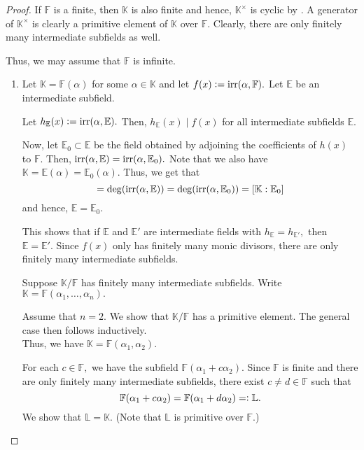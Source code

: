 \pet*\label{thm:pet2}
\begin{flushright}\hyperref[thm:pet]{\upsym}\end{flushright}
\begin{proof}
    If $\mathbb{F}$ is a finite, then $\mathbb{K}$ is also finite and hence, $\mathbb{K}^\times$ is cyclic by . A generator of $\mathbb{K}^\times$ is clearly a primitive element of $\mathbb{K}$ over $\mathbb{F}.$ Clearly, there are only finitely many intermediate subfields as well. 

    Thus, we may assume that $\mathbb{F}$ is infinite.
    \begin{enumerate}
        \item \forward Let $\mathbb{K} = \mathbb{F}(\alpha)$ for some $\alpha \in \mathbb{K}$ and let $f(x) \vcentcolon= \operatorname{irr}(\alpha, \mathbb{F}).$ Let $\mathbb{E}$ be an intermediate subfield. 

        Let $h_{\mathbb{E}}(x) \vcentcolon= \operatorname{irr}(\alpha, \mathbb{E}).$ Then, $h_{\mathbb{E}}(x) \mid f(x)$ for all intermediate subfields $\mathbb{E}.$

        Now, let $\mathbb{E}_0 \subset \mathbb{E}$ be the field obtained by adjoining the coefficients of $h(x)$ to $\mathbb{F}.$ Then, $\operatorname{irr}(\alpha, \mathbb{E}) = \operatorname{irr}(\alpha, \mathbb{E}_{0}).$ Note that we also have $\mathbb{K} = \mathbb{E}(\alpha) = \mathbb{E}_0(\alpha).$ Thus, we get that
        \begin{equation*} 
            [\mathbb{K} : \mathbb{E}] = \deg(\irr(\alpha, \mathbb{E})) = \deg(\irr(\alpha, \mathbb{E}_0)) = [\mathbb{K} : \mathbb{E}_0]
        \end{equation*}
        and hence, $\mathbb{E} = \mathbb{E}_0.$

        This shows that if $\mathbb{E}$ and $\mathbb{E}'$ are intermediate fields with $h_{\mathbb{E}} = h_{\mathbb{E}'},$ then $\mathbb{E} = \mathbb{E}'.$ Since $f(x)$ only has finitely many monic divisors, there are only finitely many intermediate subfields.

        \backward Suppose $\mathbb{K}/\mathbb{F}$ has finitely many intermediate subfields. Write $\mathbb{K} = \mathbb{F}(\alpha_1, \ldots, \alpha_n).$

        Assume that $n = 2.$ We show that $\mathbb{K}/\mathbb{F}$ has a primitive element. The general case then follows inductively. \\
        Thus, we have $\mathbb{K} = \mathbb{F}(\alpha_1, \alpha_2).$ 

        For each $c \in \mathbb{F},$ we have the subfield $\mathbb{F}(\alpha_1 + c\alpha_2).$ Since $\mathbb{F}$ is finite and there are only finitely many intermediate subfields, there exist $c \neq d \in \mathbb{F}$ such that 
        \begin{equation*} 
            \mathbb{F}(\alpha_1 + c\alpha_2) = \mathbb{F}(\alpha_1 + d\alpha_2) =\vcentcolon \mathbb{L}.
        \end{equation*} 
        We show that $\mathbb{L} = \mathbb{K}.$ (Note that $\mathbb{L}$ is primitive over $\mathbb{F}.$)


\end{enumerate}
\end{proof}
